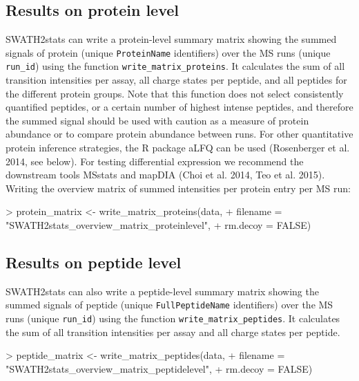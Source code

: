 \documentclass[a4paper]{article}
\begin{document}
\subsection{Results on protein level}
SWATH2stats can write a protein-level summary matrix showing the summed signals of protein (unique \texttt{ProteinName} identifiers) over the MS runs (unique \texttt{run\_id}) using the function \texttt{write\_matrix\_proteins}.
It calculates the sum of all transition intensities per assay, all charge states per peptide, and all peptides for the different protein groups. Note that this function does not select consistently quantified peptides, or a certain number of highest intense peptides, and therefore the summed signal should be used with caution as a measure of protein abundance or to compare protein abundance between runs. For other quantitative protein inference strategies, the R package aLFQ can be used (Rosenberger et al. 2014, see below). For testing differential expression we recommend the downstream tools MSstats and mapDIA (Choi et al. 2014, Teo et al. 2015).\\

Writing the overview matrix of summed intensities per protein entry per MS run:

\begin{Schunk}
\begin{Sinput}
> protein_matrix <- write_matrix_proteins(data,
+                       filename = "SWATH2stats_overview_matrix_proteinlevel",
+                       rm.decoy = FALSE)
\end{Sinput}
\end{Schunk}

\subsection{Results on peptide level}
SWATH2stats can also write a peptide-level summary matrix showing the summed signals of peptide (unique \texttt{FullPeptideName} identifiers) over the MS runs (unique \texttt{run\_id}) using the function \texttt{write\_matrix\_peptides}.
It calculates the sum of all transition intensities per assay and all charge states per peptide.

\begin{Schunk}
\begin{Sinput}
> peptide_matrix <- write_matrix_peptides(data,
+                       filename = "SWATH2stats_overview_matrix_peptidelevel",
+                       rm.decoy = FALSE)
\end{Sinput}
\end{Schunk}
\end{document}
